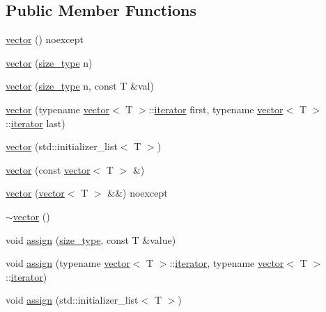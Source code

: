 \subsection*{Public Member Functions}
\begin{DoxyCompactItemize}
\item 
\mbox{\hyperlink{classvector_a19c8e215d2ae3398870702cd06b1564e}{vector}} () noexcept
\item 
\mbox{\hyperlink{classvector_a3b3d062e88da16d5273dd3c541398e86}{vector}} (\mbox{\hyperlink{classvector_ada51e68d31936547d3729c82daf6b7c6}{size\+\_\+type}} n)
\item 
\mbox{\hyperlink{classvector_a56f7268fcc571ef5d758612f3307bd8d}{vector}} (\mbox{\hyperlink{classvector_ada51e68d31936547d3729c82daf6b7c6}{size\+\_\+type}} n, const T \&val)
\item 
\mbox{\hyperlink{classvector_af21232df5cc98c665afa604649327cdf}{vector}} (typename \mbox{\hyperlink{classvector}{vector}}$<$ T $>$\+::\mbox{\hyperlink{classvector_a35c955cacac6aacaa1e82874b1628865}{iterator}} first, typename \mbox{\hyperlink{classvector}{vector}}$<$ T $>$\+::\mbox{\hyperlink{classvector_a35c955cacac6aacaa1e82874b1628865}{iterator}} last)
\item 
\mbox{\hyperlink{classvector_acc1f450ecad1c00c720208371a6c9795}{vector}} (std\+::initializer\+\_\+list$<$ T $>$)
\item 
\mbox{\hyperlink{classvector_ab7abbe99946ac8b2ea84927733f1d245}{vector}} (const \mbox{\hyperlink{classvector}{vector}}$<$ T $>$ \&)
\item 
\mbox{\hyperlink{classvector_a91aea9f7cd0bb3c9de1d20d429e94bd9}{vector}} (\mbox{\hyperlink{classvector}{vector}}$<$ T $>$ \&\&) noexcept
\item 
\mbox{\hyperlink{classvector_a886de2f986508b10e3792cd1e148eb7d}{$\sim$vector}} ()
\item 
void \mbox{\hyperlink{classvector_a620ad2b2930c23100f218a4bc5e683d4}{assign}} (\mbox{\hyperlink{classvector_ada51e68d31936547d3729c82daf6b7c6}{size\+\_\+type}}, const T \&value)
\item 
void \mbox{\hyperlink{classvector_a835933c0800934df1c17b8d6edccb5b1}{assign}} (typename \mbox{\hyperlink{classvector}{vector}}$<$ T $>$\+::\mbox{\hyperlink{classvector_a35c955cacac6aacaa1e82874b1628865}{iterator}}, typename \mbox{\hyperlink{classvector}{vector}}$<$ T $>$\+::\mbox{\hyperlink{classvector_a35c955cacac6aacaa1e82874b1628865}{iterator}})
\item 
void \mbox{\hyperlink{classvector_a4c8ca8b2010c5c196271319f425633f5}{assign}} (std\+::initializer\+\_\+list$<$ T $>$)

\end{DoxyCompactItemize}
